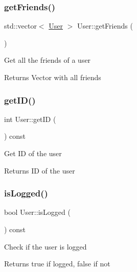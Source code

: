 \mbox{\label{classUser_ae3bf4d054a93b7d32aca8d5ccdcd1fd5}} 
\subsubsection{\texorpdfstring{get\+Friends()}{getFriends()}}
{\footnotesize\ttfamily std\+::vector$<$ \hyperlink{classUser}{User} $>$ User\+::get\+Friends (\begin{DoxyParamCaption}{ }\end{DoxyParamCaption})}

Get all the friends of a user \begin{DoxyReturn}{Returns}
Vector with all friends 
\end{DoxyReturn}
\mbox{\label{classUser_a986c6f30aeac167bb5d311dd412cf604}} 
\subsubsection{\texorpdfstring{get\+I\+D()}{getID()}}
{\footnotesize\ttfamily int User\+::get\+ID (\begin{DoxyParamCaption}{ }\end{DoxyParamCaption}) const}

Get ID of the user \begin{DoxyReturn}{Returns}
ID of the user 
\end{DoxyReturn}
\mbox{\label{classUser_a58d16c117e5c0577c793364496e78e20}} 
\subsubsection{\texorpdfstring{is\+Logged()}{isLogged()}}
{\footnotesize\ttfamily bool User\+::is\+Logged (\begin{DoxyParamCaption}{ }\end{DoxyParamCaption}) const\hspace{0.3cm}{\ttfamily [inline]}}

Check if the user is logged \begin{DoxyReturn}{Returns}
true if logged, false if not 
\end{DoxyReturn}
\mbox{\label{classUser_ad46962bd5857b933726825a88214cd96}} 
